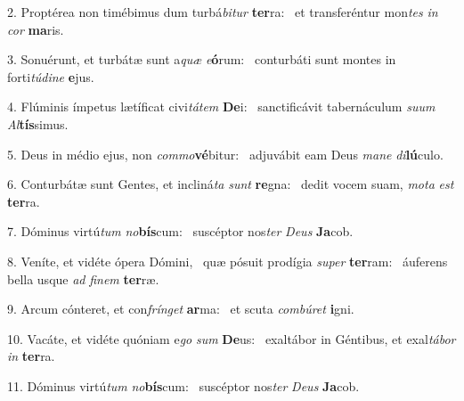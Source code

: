 2. Proptérea non timébimus dum turbá\textit{bi}\textit{tur} \textbf{ter}ra: \ast\  et transferéntur mon\textit{tes} \textit{in} \textit{cor} \textbf{ma}ris.\

3. Sonuérunt, et turbátæ sunt a\textit{quæ} \textit{e}\textbf{ó}rum: \ast\  conturbáti sunt montes in forti\textit{tú}\textit{di}\textit{ne} \textbf{e}jus.\

4. Flúminis ímpetus lætíficat civi\textit{tá}\textit{tem} \textbf{De}i: \ast\  sanctificávit tabernáculum \textit{su}\textit{um} \textit{Al}\textbf{tís}simus.\

5. Deus in médio ejus, non \textit{com}\textit{mo}\textbf{vé}bitur: \ast\  adjuvábit eam Deus \textit{ma}\textit{ne} \textit{di}\textbf{lú}culo.\

6. Conturbátæ sunt Gentes, et incliná\textit{ta} \textit{sunt} \textbf{re}gna: \ast\  dedit vocem suam, \textit{mo}\textit{ta} \textit{est} \textbf{ter}ra.\

7. Dóminus virtú\textit{tum} \textit{no}\textbf{bís}cum: \ast\  suscéptor nos\textit{ter} \textit{De}\textit{us} \textbf{Ja}cob.\

8. Veníte, et vidéte ópera Dómini, \dag\  quæ pósuit prodígia \textit{su}\textit{per} \textbf{ter}ram: \ast\  áuferens bella usque \textit{ad} \textit{fi}\textit{nem} \textbf{ter}ræ.\

9. Arcum cónteret, et con\textit{frín}\textit{get} \textbf{ar}ma: \ast\  et scuta \textit{com}\textit{bú}\textit{ret} \textbf{i}gni.\

10. Vacáte, et vidéte quóniam e\textit{go} \textit{sum} \textbf{De}us: \ast\  exaltábor in Géntibus, et exal\textit{tá}\textit{bor} \textit{in} \textbf{ter}ra.\

11. Dóminus virtú\textit{tum} \textit{no}\textbf{bís}cum: \ast\  suscéptor nos\textit{ter} \textit{De}\textit{us} \textbf{Ja}cob.\

